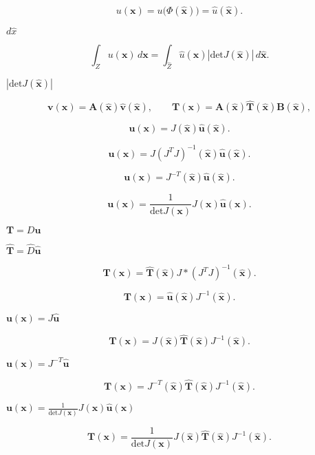 \documentclass{article}
\begin{document}
\[ u(\mathbf x) = u\bigl(\Phi(\mathbf{\hat x})\bigr) = \hat u(\mathbf{\hat x}). \]
\pagebreak

$d\hat x$
\pagebreak

\[ \int_Z u(\mathbf x)\,d\mathbf x = \int_{\hat Z} \hat u(\mathbf{\hat x}) \left|\text{det}J(\mathbf{\hat x})\right| \,d\mathbf{\hat x}. \]
\pagebreak

$\left|\text{det}J(\mathbf{\hat x})\right|$
\pagebreak

\[ \mathbf v(\mathbf x) = \mathbf A(\mathbf{\hat x}) \mathbf{\hat v}(\mathbf{\hat x}), \qquad \mathbf T(\mathbf x) = \mathbf A(\mathbf{\hat x}) \mathbf{\hat T}(\mathbf{\hat x}) \mathbf B(\mathbf{\hat x}), \]
\pagebreak

\[ \mathbf u(\mathbf x) = J(\mathbf{\hat x})\mathbf{\hat u}(\mathbf{\hat x}). \]
\pagebreak

\[ \mathbf u(\mathbf x) = J(J^{T} J)^{-1}(\mathbf{\hat x})\mathbf{\hat u}(\mathbf{\hat x}). \]
\pagebreak

\[ \mathbf u(\mathbf x) = J^{-T}(\mathbf{\hat x})\mathbf{\hat u}(\mathbf{\hat x}). \]
\pagebreak

\[ \mathbf u(\mathbf x) = \frac{1}{\text{det}J(\mathbf x)} J(\mathbf x) \mathbf{\hat u}(\mathbf x). \]
\pagebreak

$\mathbf{T} = D \mathbf u$
\pagebreak

$\mathbf{\hat T} = \hat D \mathbf{\hat u}$
\pagebreak

\[ \mathbf T(\mathbf x) = \mathbf{\hat T}(\mathbf{\hat x}) J*(J^{T} J)^{-1}(\mathbf{\hat x}). \]
\pagebreak

\[ \mathbf T(\mathbf x) = \mathbf{\hat u}(\mathbf{\hat x}) J^{-1}(\mathbf{\hat x}). \]
\pagebreak

$\mathbf u(\mathbf x) = J \mathbf{\hat u}$
\pagebreak

\[ \mathbf T(\mathbf x) = J(\mathbf{\hat x}) \mathbf{\hat T}(\mathbf{\hat x}) J^{-1}(\mathbf{\hat x}). \]
\pagebreak

$\mathbf u(\mathbf x) = J^{-T} \mathbf{\hat u}$
\pagebreak

\[ \mathbf T(\mathbf x) = J^{-T}(\mathbf{\hat x}) \mathbf{\hat T}(\mathbf{\hat x}) J^{-1}(\mathbf{\hat x}). \]
\pagebreak

$\mathbf u(\mathbf x) = \frac{1}{\text{det}J(\mathbf x)} J(\mathbf x) \mathbf{\hat u}(\mathbf x)$
\pagebreak

\[ \mathbf T(\mathbf x) = \frac{1}{\text{det}J(\mathbf x)} J(\mathbf{\hat x}) \mathbf{\hat T}(\mathbf{\hat x}) J^{-1}(\mathbf{\hat x}). \]
\pagebreak
\end{document}
